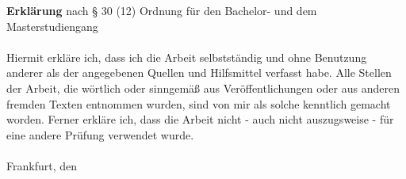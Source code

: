 \thispagestyle{empty}
\textbf{Erklärung} nach § 30 (12) Ordnung für den Bachelor- und dem Masterstudiengang\\
\vspace*{1cm}\\
Hiermit erkläre ich, dass ich die Arbeit selbstständig und ohne Benutzung anderer als der angegebenen Quellen und Hilfsmittel verfasst habe. Alle Stellen der Arbeit, die wörtlich oder sinngemäß aus Veröffentlichungen oder aus anderen fremden Texten entnommen wurden, sind von mir als solche kenntlich gemacht worden. Ferner erkläre ich, dass die Arbeit nicht - auch nicht auszugsweise - für eine andere Prüfung verwendet wurde. \\
\vspace*{2cm}\\
Frankfurt, den